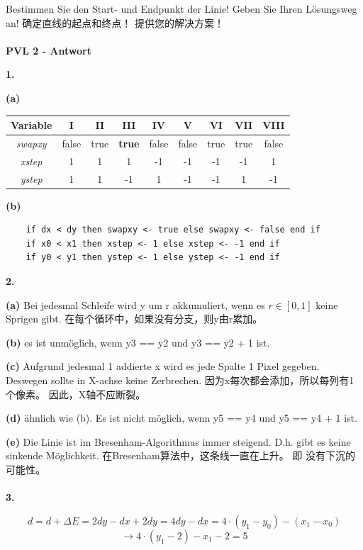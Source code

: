\documentclass[fleqn]{article}
\begin{document}
\indent Bestimmen Sie den Start- und Endpunkt der Linie! Geben Sie Ihren Lösungsweg an!
确定直线的起点和终点！ 提供您的解决方案！
\\
\\
\noindent\textbf{PVL 2 - Antwort}

\indent\textbf{1.}

\indent\indent\textbf{(a)}

\begin{center}
    \begin{tabular}{c|c|c|c|c|c|c|c|c}
        Variable &I&II&III&IV&V&VI&VII&VIII\\
        \hline
        \hline
        \textit{swapxy}&false&true&\textbf{true}&false&false&true&true&false\\
        \hline
        \textit{xstep}&1&1&1&-1&-1&-1&-1&1\\
        \hline
        \textit{ystep}&1&1&-1&1&-1&-1&1&-1
    \end{tabular}
\end{center}

\indent\indent\textbf{(b)}

\begin{lstlisting}
    if dx < dy then swapxy <- true else swapxy <- false end if
    if x0 < x1 then xstep <- 1 else xstep <- -1 end if
    if y0 < y1 then ystep <- 1 else ystep <- -1 end if
\end{lstlisting}

\indent\textbf{2.}

\indent\indent\textbf{(a)} Bei jedesmal Schleife wird y um r akkumuliert, wenn es $r\in[0,1]$ keine Sprigen gibt.
在每个循环中，如果没有分支，则y由r累加。

\indent\indent\textbf{(b)} es ist unmöglich, wenn y3 == y2 und y3 == y2 + 1 ist.

\indent\indent\textbf{(c)} Aufgrund jedesmal 1 addierte x wird es jede Spalte 1 Pixel gegeben. Deswegen sollte in X-achse keine Zerbrechen. 
因为x每次都会添加，所以每列有1个像素。 因此，X轴不应断裂。

\indent\indent\textbf{(d)} ähnlich wie (b). Es ist nicht möglich, wenn y5 == y4 und y5 == y4 + 1 ist.

\indent\indent\textbf{(e)} Die Linie ist im Bresenham-Algorithmus immer steigend. D.h. gibt es keine sinkende Möglichkeit.
在Bresenham算法中，这条线一直在上升。 即 没有下沉的可能性。
\\
\\
\indent\textbf{3.}

$$d=d+\Delta E = 2dy-dx+2dy=4dy-dx=4\cdot(y_1-y_0)-(x_1-x_0)$$
$$\rightarrow4\cdot(y_1-2)-x_1-2=5$$
\end{document}
